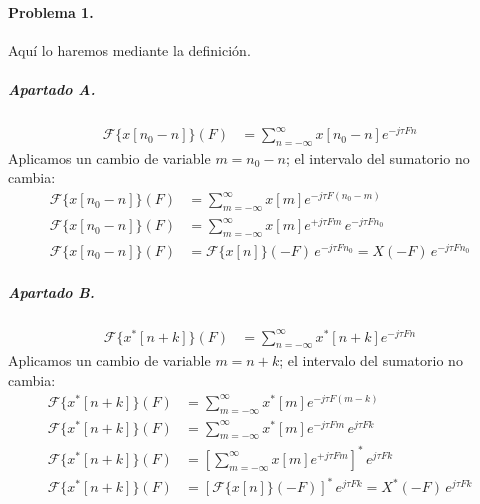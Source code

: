 


\startpage

\paragraph{Problema 1.}

Aquí lo haremos mediante la definición.

\subparagraph{Apartado A.}

\begin{align*}
  \mathcal{F}\{ x[n_0 - n] \}(F)
  &= \sum_{n = -\infty}^{\infty} x[n_0 - n] e^{-j\tau F n}
\end{align*}
%
Aplicamos un cambio de variable $m = n_0 - n$; el intervalo del sumatorio no
cambia:
%
\begin{align*}
  \mathcal{F}\{ x[n_0 - n] \}(F)
  &= \sum_{m = -\infty}^{\infty} x[m] e^{-j\tau F \left( n_0 - m \right) }
\\
  \mathcal{F}\{ x[n_0 - n] \}(F)
  &= \sum_{m = -\infty}^{\infty} x[m] e^{+j\tau F m }
    \, e^{-j\tau F n_0 }
\\
  \mathcal{F}\{ x[n_0 - n] \}(F)
  &= \mathcal{F}\{ x[n] \}(-F) \, e^{-j\tau F n_0 } = X(-F)\, e^{-j\tau F n_0 }
\end{align*}

\subparagraph{Apartado B.}

\begin{align*}
  \mathcal{F}\{ x^*[n + k] \}(F)
  &= \sum_{n = -\infty}^{\infty} x^*[n + k] e^{-j\tau F n}
\end{align*}
%
Aplicamos un cambio de variable $m = n + k$; el intervalo del sumatorio no
cambia:
%
\begin{align*}
  \mathcal{F}\{ x^*[n + k] \}(F)
  &= \sum_{m = -\infty}^{\infty} x^*[m] e^{-j\tau F \left( m - k \right) }
\\
  \mathcal{F}\{ x^*[n + k] \}(F)
  &= \sum_{m = -\infty}^{\infty} x^*[m] e^{-j\tau F m }
    \, e^{j\tau F k }
\\
  \mathcal{F}\{ x^*[n + k] \}(F)
  &= \left[ \sum_{m = -\infty}^{\infty} x[m] e^{+j\tau F m } \right]^*
    \, e^{j\tau F k }
\\
  \mathcal{F}\{ x^*[n + k] \}(F)
  &= \left[ \mathcal{F}\{ x[n] \}(-F) \right]^*
    \, e^{j\tau F k } = X^*(-F)\, e^{j\tau F k }
\end{align*}

\finishpage
\startpage


